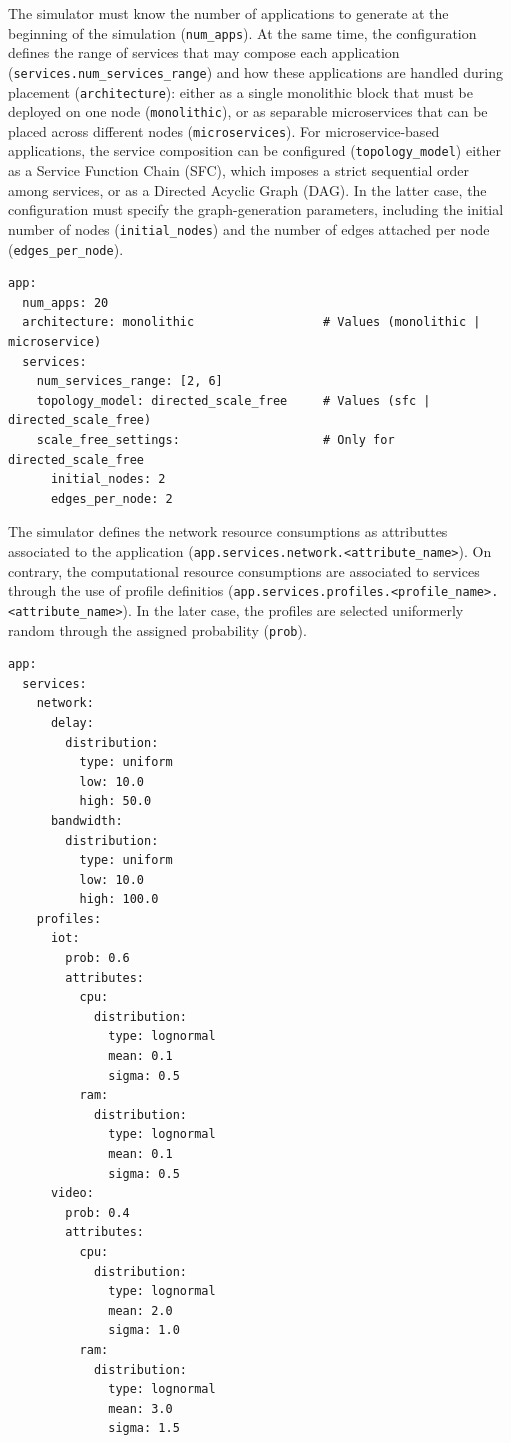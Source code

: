 \documentclass[ASNA]{USG} %
\begin{document}
The simulator must know the number of applications to generate at the beginning of the simulation (\texttt{num\_apps}). At the same time, the configuration defines the range of services that may compose each application (\texttt{services.num\_services\_range}) and how these applications are handled during placement (\texttt{architecture}): either as a single monolithic block that must be deployed on one node (\texttt{monolithic}), or as separable microservices that can be placed across different nodes (\texttt{microservices}). For microservice-based applications, the service composition can be configured (\texttt{topology\_model}) either as a Service Function Chain (SFC), which imposes a strict sequential order among services, or as a Directed Acyclic Graph (DAG). In the latter case, the configuration must specify the graph-generation parameters, including the initial number of nodes (\texttt{initial\_nodes})  and the number of edges attached per node (\texttt{edges\_per\_node}).

\begin{lstlisting}[caption={YAML configuration for application creation.},label=lst:user_event, basicstyle=\fontsize{8}{10}\selectfont\ttfamily]
app:
  num_apps: 20
  architecture: monolithic                  # Values (monolithic | microservice)
  services:
    num_services_range: [2, 6]
    topology_model: directed_scale_free     # Values (sfc | directed_scale_free)
    scale_free_settings:                    # Only for directed_scale_free
      initial_nodes: 2
      edges_per_node: 2
\end{lstlisting}

The simulator defines the network resource consumptions as attributtes associated to the application (\texttt{app.services.network.<attribute\_name>}). On contrary, the computational resource consumptions are associated to services through the use of profile definitios (\texttt{app.services.profiles.<profile\_name>.<attribute\_name>}). In the later case, the profiles are selected uniformerly random through the assigned probability (\texttt{prob}).

\begin{lstlisting}[caption={YAML configuration for resource consumptions and profiles definition of the services.},label=lst:user_event, basicstyle=\fontsize{8}{10}\selectfont\ttfamily]
app:
  services:
    network:
      delay:
        distribution:
          type: uniform
          low: 10.0
          high: 50.0
      bandwidth:
        distribution:
          type: uniform
          low: 10.0
          high: 100.0
    profiles:
      iot:
        prob: 0.6
        attributes:
          cpu:
            distribution:
              type: lognormal
              mean: 0.1
              sigma: 0.5
          ram:
            distribution:
              type: lognormal
              mean: 0.1
              sigma: 0.5
      video:
        prob: 0.4
        attributes:
          cpu:
            distribution:
              type: lognormal
              mean: 2.0
              sigma: 1.0
          ram:
            distribution:
              type: lognormal
              mean: 3.0
              sigma: 1.5
\end{lstlisting}
\end{document}
